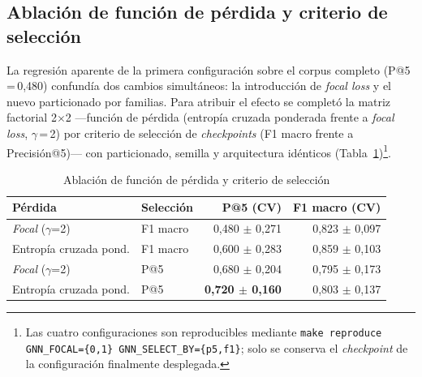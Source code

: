 \subsection{Ablación de función de pérdida y criterio de selección}
\label{sec:ablacion_perdida}

La regresión aparente de la primera configuración sobre el corpus completo
(P@5\,=\,0,480) confundía dos cambios simultáneos: la introducción de
\textit{focal loss} \citep{Lin2017} y el nuevo particionado por familias. Para
atribuir el efecto se completó la matriz factorial 2\(\times\)2 —función de
pérdida (entropía cruzada ponderada frente a \textit{focal loss},
\(\gamma\)\,=\,2) por criterio de selección de \textit{checkpoints} (F1 macro
frente a Precisión@5)— con particionado, semilla y arquitectura idénticos
(Tabla~\ref{tab:loss_ablation})\footnote{Las cuatro configuraciones son reproducibles
mediante \texttt{make reproduce GNN\_FOCAL=\{0,1\} GNN\_SELECT\_BY=\{p5,f1\}}; solo se
conserva el \textit{checkpoint} de la configuración finalmente desplegada.}.

\begin{table}[htbp]
\centering
\caption{Ablación de función de pérdida y criterio de selección}
\label{tab:loss_ablation}
\begin{tabular}{@{}llrr@{}}
\toprule
Pérdida & Selección & P@5 (\acs{CV}) & F1 macro (\acs{CV}) \\
\midrule
\textit{Focal} (\(\gamma\)=2) & F1 macro & 0,480 \(\pm\) 0,271 & 0,823 \(\pm\) 0,097 \\
Entropía cruzada pond. & F1 macro & 0,600 \(\pm\) 0,283 & 0,859 \(\pm\) 0,103 \\
\textit{Focal} (\(\gamma\)=2) & P@5 & 0,680 \(\pm\) 0,204 & 0,795 \(\pm\) 0,173 \\
Entropía cruzada pond. & P@5 & \textbf{0,720 \(\pm\) 0,160} & 0,803 \(\pm\) 0,137 \\
\bottomrule
\end{tabular}
\fuentepropia
\end{table}

